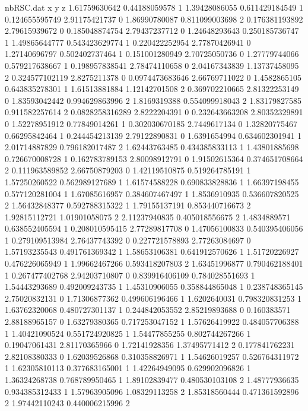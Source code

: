 \begin{filecontents}{nbRSC.dat}
x y z
1.61759630642 0.44188059578 1
1.39428086055 0.611429184549 1
0.124655595749 2.91175421737 0
1.86990780087 0.811099003698 2
0.176381193892 2.79615939672 0
0.185048874754 2.79437237712 0
1.24648293643 0.250185736747 1
1.49865644777 0.543423629774 1
0.220422252954 2.77870426941 0
1.27140696797 0.502402737464 1
0.151001280949 2.70725050736 0
1.27779744066 0.579217638667 1
0.198957838541 2.78474110658 0
2.04167343839 1.13737458095 2
0.324577102119 2.8275211378 0
0.0974473683646 2.66769711022 0
1.4582865105 0.643835278301 1
1.61513881884 1.12142701508 2
0.369702210665 2.81322253149 0
1.83593042442 0.994629863996 2
1.8169319388 0.554099918043 2
1.83179827585 0.911582257614 2
0.0828258316289 2.8222204391 0
0.232643663208 2.80352329891 0
1.52278951912 0.77849014261 1
0.302030670185 2.7449617134 0
1.32820775467 0.66295842464 1
0.244454213139 2.79122890831 0
1.6391654994 0.634602301941 1
2.01714887829 0.796182017487 2
1.62443763485 0.434385833113 1
1.43801885698 0.726670008728 1
0.162783789153 2.80098912791 0
1.91502615364 0.374651708664 2
0.111963589852 2.66750879203 0
1.42119510875 0.519264785191 1
1.57250260522 0.562989127689 1
1.61574588228 0.690833828836 1
1.66397198455 0.577120281004 1
1.67085616957 0.384607467497 1
1.8536910935 0.536607820525 2
1.56432848377 0.592788315322 1
1.79155137191 0.853440716673 2
1.92815112721 1.01901058075 2
2.11237940835 0.405018556675 2
1.4834889571 0.638552405594 1
0.208010595415 2.77289817708 0
1.47056100833 0.540395406056 1
0.279109513984 2.76437743392 0
0.227721578893 2.77263084697 0
1.57193235543 0.491761369342 1
1.58653106381 0.641912570626 1
1.51720226927 0.476226065949 1
1.99662467266 0.593418207803 2
1.63451996877 0.790462188401 1
0.267477402768 2.94203710807 0
0.839916406109 0.784028551693 1
1.54443293689 0.492009243735 1
1.45310906055 0.358844865048 1
0.238748365145 2.75020832131 0
1.71306877362 0.499606196466 1
1.6202640031 0.798320831253 1
1.63762320068 0.480727301137 1
0.244842053552 2.85219893688 0
0.160383571 2.88188965157 0
1.63279380365 0.717253047152 1
1.57626419922 0.484057706388 1
1.40421090524 0.551724920825 1
1.54477855255 0.802744267266 1
0.19047061431 2.81170365966 0
1.72141928356 1.37495771412 2
0.177841762231 2.82108380333 0
1.62039526868 0.310358826971 1
1.54626019257 0.526764311972 1
1.62305810113 0.377683165001 1
1.42264949095 0.629902096826 1
1.36324268738 0.768789950465 1
1.89102839477 0.480530103108 2
1.48777936635 0.934385312433 1
1.57963905096 1.08329113258 2
1.85318560444 0.471361592896 2
1.97442110243 0.440006215996 2

\end{filecontents}
